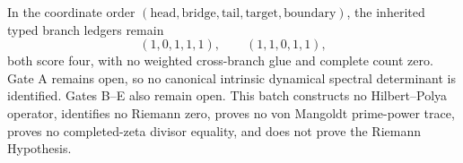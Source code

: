 \documentclass[11pt]{article}
\theoremstyle{remark}\newtheorem{remark}[theorem]{Remark}
\begin{document}
In the coordinate order
$(\mathrm{head},\mathrm{bridge},\mathrm{tail},\mathrm{target},
\mathrm{boundary})$, the inherited typed branch ledgers remain
\[
 (1,0,1,1,1),\qquad (1,1,0,1,1),                                \tag{10}
\]
both score four, with no weighted cross-branch glue and complete count zero.
Gate A remains open, so no canonical intrinsic dynamical spectral
determinant is identified.  Gates B--E also remain open.  This batch
constructs no Hilbert--Polya operator, identifies no Riemann zero, proves no
von Mangoldt prime-power trace, proves no completed-zeta divisor equality,
and does not prove the Riemann Hypothesis.
\end{document}
